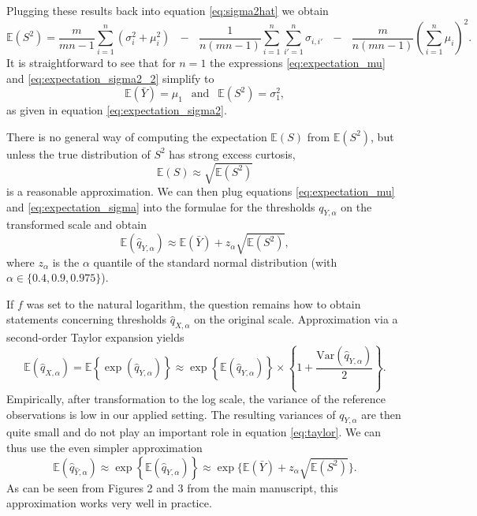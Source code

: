 \documentclass{article}
\begin{document}
Plugging these results back into equation \eqref{eq:sigma2hat} we obtain
\begin{equation}
\mathbb{E}(S^2) = \frac{m}{mn - 1} \sum_{i = 1}^n (\sigma_{i}^2 + \mu_i^2) \ \ \ - \ \ \ \frac{1}{n(mn - 1)} \sum_{i = 1}^n \sum_{i' = 1}^n \sigma_{i,i'} \ \ \ - \ \ \ \frac{m}{n(mn - 1)}\left(\sum_{i = 1}^n \mu_i\right)^2.
\label{eq:expectation_sigma2_2}
\end{equation}
It is straightforward to see that for $n = 1$ the expressions \eqref{eq:expectation_mu} and \eqref{eq:expectation_sigma2_2} simplify to
$$
\mathbb{E}(\bar{Y}) = \mu_1 \ \ \text{ and } \ \ \mathbb{E}(S^2) = \sigma^2_1,
$$
as given in equation \eqref{eq:expectation_sigma2}.

There is no general way of computing the expectation $\mathbb{E}(S)$ from $\mathbb{E}(S^2)$, but unless the true distribution of  $S^2$ has strong excess curtosis,
\begin{equation}
\mathbb{E}(S) \approx \sqrt{\mathbb{E}(S^2)}
\label{eq:expectation_sigma}
\end{equation}
is a reasonable approximation. We can then plug equations \eqref{eq:expectation_mu} and \eqref{eq:expectation_sigma} into the formulae for the thresholds $q_{Y, \alpha}$ on the transformed scale and obtain
$$
\mathbb{E}(\hat{q}_{Y, \alpha}) \approx \mathbb{E}(\bar{Y}) + z_\alpha \sqrt{\mathbb{E}(S^2)},
$$
where $z_\alpha$ is the $\alpha$ quantile of the standard normal distribution (with $\alpha \in \{0.4, 0.9, 0.975\}$).

If $f$ was set to the natural logarithm, the question remains how to obtain statements concerning thresholds $\hat{q}_{X, \alpha}$ on the original scale. Approximation via a second-order Taylor expansion yields
\begin{equation}
\mathbb{E}(\hat{q}_{X, \alpha}) = \mathbb{E}\left\{\exp(\hat{q}_{Y, \alpha})\right\} \approx \exp\left\{\mathbb{E}(\hat{q}_{Y, \alpha})\right\} \times \left\{1 + \frac{\text{Var}(\hat{q}_{Y, \alpha})}{2} \right\}.
\label{eq:taylor}
\end{equation}
Empirically, after transformation to the log scale, the variance of the reference observations is low in our applied setting. The resulting variances of $q_{Y, \alpha}$ are then quite small and do not play an important role in equation \eqref{eq:taylor}. We can thus use the even simpler approximation
\begin{equation}
\mathbb{E}(\hat{q}_{\hat{Y}, \alpha}) \approx \exp\left\{\mathbb{E}(\hat{q}_{Y, \alpha})\right\} \approx \exp\{\mathbb{E}(\bar{Y}) + z_\alpha \sqrt{\mathbb{E}(S^2)}\}.
\end{equation}
As can be seen from Figures 2 and 3 from the main manuscript, this approximation works very well in practice. %
\end{document}
